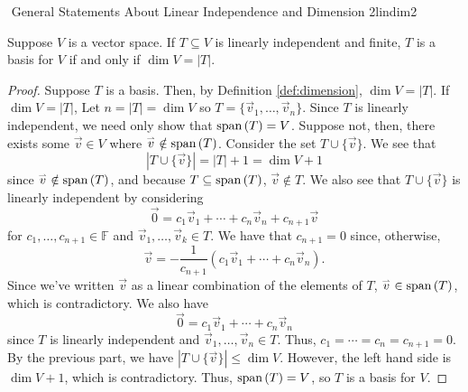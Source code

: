         \begin{theorem}{\Stop\,\,General Statements About Linear Independence and Dimension 2}{lindim2}
            
            Suppose \(V\) is a vector space. If \(T\subseteq V\) is linearly independent and finite, \(T\) is a basis for \(V\) if and only if \(\dim V = |T|\).
            \begin{proof}
                Suppose \(T\) is a basis. Then, by Definition \ref{def:dimension}, \(\dim V = |T|\). If \(\dim V = |T|\), Let \(n=|T|=\dim V\) so \(T=\{\vec{v}_1,\ldots,\vec{v}_n\}\). Since \(T\) is linearly independent, we need only show that \(\text{span\,}(T)=V\). Suppose not, then, there exists some \(\vec{v}\in V\) where \(\overset{_{\rightharpoonup}}{v}\notin \text{span\,}(T)\). Consider the set \(T\cup\{\vec{v}\}\). We see that
                \begin{equation*}
                    |T\cup\{\vec{v}\}|=|T|+1=\dim V+1
                \end{equation*}
                since \(\overset{_{\rightharpoonup}}{v}\notin\text{span\,}(T)\), and because \(T\subseteq\text{span\,}(T)\), \(\vec{v}\nin T\). We also see that \(T\cup\{\vec{v}\}\) is linearly independent by considering
                \begin{equation*}
                    \vec{0}=c_1\vec{v}_1+\cdots+c_n\vec{v}_n+c_{n+1}\vec{v}
                \end{equation*}
                for \(c_1,\ldots,c_{n+1}\in\mathbb{F}\) and \(\vec{v}_1,\ldots,\vec{v}_k\in T\). We have that \(c_{n+1}=0\) since, otherwise, 
                \begin{equation*}
                    \vec{v}=-\frac{1}{c_{n+1}}(c_1\vec{v}_1+\cdots+c_n\vec{v}_n).
                \end{equation*}
                Since we've written \(\vec{v}\) as a linear combination of the elements of \(T\), \(\overset{_{\rightharpoonup}}{v}\in\text{span\,}(T)\), which is contradictory. We also have
                \begin{equation*}
                    \vec{0}=c_1\vec{v}_1+\cdots+c_n\vec{v}_n
                \end{equation*}
                since \(T\) is linearly independent and \(\vec{v}_1,\ldots,\vec{v}_n\in T\). Thus, \(c_1=\cdots=c_n=c_{n+1}=0\). By the previous part, we have \(|T\cup\{\vec{v}\}|\leq\dim V\). However, the left hand side is \(\dim V+1\), which is contradictory. Thus, \(\text{span\,}(T)=V\), so \(T\) is a basis for \(V\).
            \end{proof}
        
        \end{theorem}

